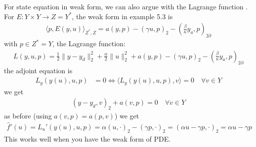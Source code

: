 \begin{remark}
For state equation in weak form, we can also argue with the Lagrange function	.\\
For $E : Y \times Y \rightarrow Z = Y^*$, the weak form in example 5.3 is 
\begin{align*}
	\langle p, E(y, u) \rangle_{Z^*, Z} = a (y, p) - (\gamma u , p)_2 - (\frac{\beta}{\kappa}y_a, p)_{2 \partial}
\end{align*}
with $p \in Z^* = Y$, the Lagrange function:
\begin{align*}
	L(y, u, p) = \frac{1}{2}\|y - y_d\|^2_2 + \frac{\alpha}{2} \|u\|^2_2 + a(y, p) - (\gamma u, p)_2 - (\frac{\beta}{\kappa}y_a, p)_{2 \partial}
\end{align*}
the adjoint equation is 
\begin{align*}
	L_y(y(u), u, p) &= 0 \Leftrightarrow \langle L_y(y(u), u, p), v \rangle = 0 \quad \forall v \in Y
\end{align*}
we get
\begin{align*}
	(y - y_d, v)_2 + a(v, p) = 0 \quad \forall v \in Y
\end{align*}
as before (using $a(v, p) = a(p, v)$) we get
\begin{align*}
	\hat{f}'(u) = L_u'(y(u), u, p) = \alpha(u, \cdot)_2 - (\gamma p, \cdot)_2 = (\alpha u - \gamma p, \cdot)_2 = \alpha u - \gamma p
\end{align*}
This works well when you have the weak form of PDE. 
\end{remark}
\quad\\
\quad\\

